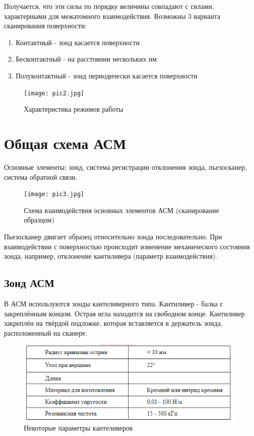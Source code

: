 \documentclass[a4paper,12pt]{article}
\theoremstyle{plain} %
\theoremstyle{definition} %
\theoremstyle{remark} %
\begin{document}
Получается, что эти силы по порядку величины совпадают с силами, характерными для межатомного взаимодействия.
Возможны 3 варианта сканирования поверхности:
\begin{enumerate}
	\item
Контактный - зонд касается поверхности
\item
Бесконтактный - на расстоянии нескольких нм
\item
Полуконтактный - зонд периодически касается поверхности
\end{enumerate}
\begin{figure}[H]
	\centering
	\texttt{[image: pic2.jpg]}
	\caption{Характеристика режимов работы}
	\label{pшс}
\end{figure}
\section{Общая схема АСМ}
Основные элементы: зонд, система регистрации отклонения зонда, пьезосканер, система обратной связи.
\begin{figure}[H]
	\centering
	\texttt{[image: pic3.jpg]}
	\caption{Схема взаимодействия основных элементов АСМ (сканирование образцом)}
	\label{pic3}
\end{figure}
Пьезосканер двигает образец относительно зонда последовательно. При взаимодействии с поверхностью происходит изменение механического состояния зонда, например, отклонение кантиливера (параметр взаимодействия).
\subsection{Зонд АСМ}
В АСМ используются зонды кантеливерного типа. Кантиливер - балка с закреплённым концом. Острая игла находится на свободном конце. Кантиливер закреплён на твёрдой подложке, которая вставляется в держатель зонда, расположенный на сканере. 
\begin{figure}[H]
	\centering
	\includegraphics[scale=1]{pic4.png}
	\caption{Некоторые параметры кантеливеров}
	\label{pic4}
\end{figure}
\end{document}
